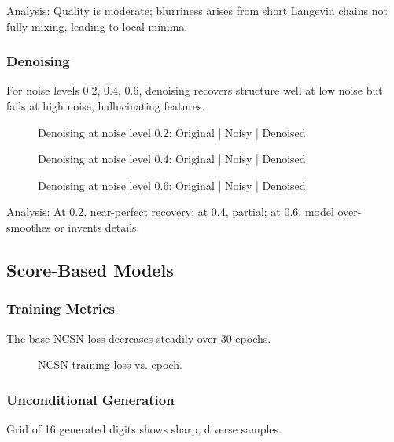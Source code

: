\documentclass[a4paper,12pt]{article}
\begin{document}
Analysis: Quality is moderate; blurriness arises from short Langevin chains not fully mixing, leading to local minima.

\subsubsection{Denoising}
For noise levels 0.2, 0.4, 0.6, denoising recovers structure well at low noise but fails at high noise, hallucinating features.

\begin{figure}[H]
\centering
{}
\caption{Denoising at noise level 0.2: Original | Noisy | Denoised.}
\label{fig:ebm_denoise_0.2}
\end{figure}

\begin{figure}[H]
\centering
{}
\caption{Denoising at noise level 0.4: Original | Noisy | Denoised.}
\label{fig:ebm_denoise_0.4}
\end{figure}

\begin{figure}[H]
\centering
{}
\caption{Denoising at noise level 0.6: Original | Noisy | Denoised.}
\label{fig:ebm_denoise_0.6}
\end{figure}

Analysis: At 0.2, near-perfect recovery; at 0.4, partial; at 0.6, model over-smoothes or invents details.

\subsection{Score-Based Models}

\subsubsection{Training Metrics}
The base NCSN loss decreases steadily over 30 epochs.

\begin{figure}[H]
\centering
{}
\caption{NCSN training loss vs. epoch.}
\label{fig:ncsn_loss}
\end{figure}

\subsubsection{Unconditional Generation}
Grid of 16 generated digits shows sharp, diverse samples.
\end{document}
